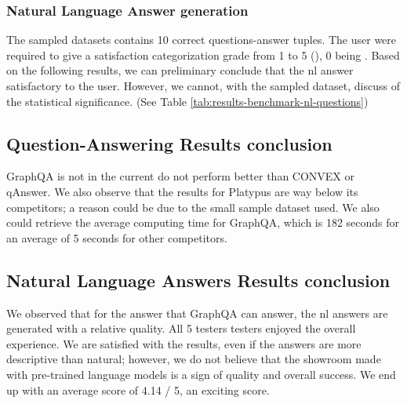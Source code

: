 \subsubsection{Natural Language Answer generation}
The sampled datasets contains 10 correct questions-answer tuples. The user were required to give a satisfaction categorization grade from 1  to 5 (), 0 being .  Based on the following results, we can preliminary conclude that the \gls{nl} answer satisfactory to the user. However, we cannot, with the sampled dataset, discuss of the statistical significance. 
(See Table \ref{tab:results-benchmark-nl-questions})



\subsection{Question-Answering Results conclusion}
GraphQA is not in the current do not perform better than CONVEX or qAnswer. We also observe that the results for Platypus are way below its competitors; a reason could be due to the small sample dataset used. We also could retrieve the average computing time for GraphQA, which is 182 seconds for an average of 5 seconds for other competitors.


\subsection{Natural Language Answers Results conclusion}
We observed that for the answer that GraphQA can answer, the \gls{nl} answers are generated with a relative quality. All 5 testers testers enjoyed the overall experience. We are satisfied with the results, even if the answers are more descriptive than natural; however, we do not believe that the showroom made with pre-trained language models is a sign of quality and overall success. We end up with an average score of 4.14 / 5, an exciting score.

\setlength{\tabcolsep}{.5pt}
\renewcommand{\arraystretch}{0.05}

